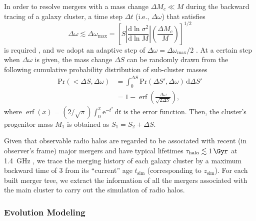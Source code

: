 \documentclass[twocolumn]{aastex62}
\newcommand{\R}[1]{\mathrm{#1}}
\newcommand{\D}[1]{\R{d} #1}
\newcommand{\diff}[2]{\frac{\D{#1}}{\D{#2}}}
\newcommand{\editone}[1]{{\leavevmode\color{cyan}#1}}
\DeclareMathOperator{\erf}{erf}
\begin{document}
In order to resolve mergers with a mass change $\Delta M_c \ll M$
during the backward tracing of a galaxy cluster, a time step $\Delta t$
(i.e., $\Delta\omega$) that satisfies
\begin{equation}
  \label{sec:dw-step}
  \Delta\omega \lesssim \Delta\omega_{\R{max}} = \left[
    S \left| \diff{\ln \sigma^2}{\ln M} \right|
    \left( \frac{\Delta M_c}{M} \right) \right]^{1/2}
\end{equation}
is required \citep{lacey1993}, and we adopt an adaptive step of
$\Delta\omega = \Delta\omega_{\R{max}} / 2$ \citep{randall2002}.
At a certain step when $\Delta\omega$ is given, the mass change
$\Delta S$ can be randomly drawn from the following cumulative
probability distribution of sub-cluster masses
\begin{align}
  \label{sec:cdf-sub-masses}
  \R{Pr}(<\!\Delta S, \Delta\omega)
    & = \int_0^{\Delta S} \R{Pr}(\Delta S', \Delta\omega) \,\D{\Delta S'} \\
    & = 1 - \erf \!\left( \frac{\Delta \omega}{\sqrt{2 \Delta S}} \right),
\end{align}
where
$\erf(x) = (2/\sqrt{\pi}) \int_0^x \R{e}^{-t^2} \,\D{t}$
is the error function.
Then, the cluster's progenitor mass $M_1$ is obtained as
$S_1 = S_2 + \Delta S$.

Given that observable radio halos are regarded to be associated
with recent (in observer's frame) major mergers
and have typical lifetimes $\tau_{\R{halo}} \lesssim \SI{1}{\Gyr}$
at \SI{1.4}{\GHz} \citep[e.g.,][]{brunetti2009,cassano2016},
we trace the merging history of each galaxy cluster by a maximum
backward time of \SI{3}{\Gyr} from its \enquote{current} age
$t_{\R{sim}}$ (corresponding to $z_{\R{sim}}$).
For each built merger tree, we extract the information of all
the mergers associated with the main cluster to carry out the
simulation of radio halos.


\subsubsection{\editone{Evolution Modeling}}
\label{sec:halo-evo}
\end{document}
